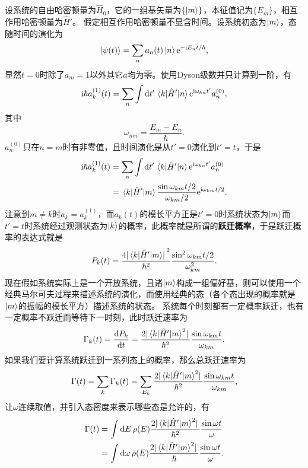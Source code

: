 \documentclass[UTF8, a4paper]{ctexart}
\newcommand*{\ii}{\mathrm{i}}
\newcommand*{\ee}{\mathrm{e}}
\begin{document}
设系统的自由哈密顿量为$\hat{H}_0$，它的一组基矢量为$\{\ket{m}\}$，本征值记为$\{E_m\}$，相互作用哈密顿量为$\hat{H}'$。
假定相互作用哈密顿量不显含时间。设系统初态为$\ket{m}$，态随时间的演化为
\[
    \ket{\psi(t)} = \sum_n a_n(t) \ket{n} \ee^{- \ii E_n t / \hbar},
\]
显然$t=0$时除了$a_m=1$以外其它$a$均为零。使用Dyson级数并只计算到一阶，有
\[
    \ii \hbar a^{(1)}_k(t) = \sum_n \int \dd{t'} \mel{k}{\hat{H}'}{n} \ee^{\ii \omega_{kn} t'} a_n^{(0)},
\]
其中
\[
    \omega_{mn} = \frac{E_m - E_n}{\hbar}.
\]
$a_n^{(0)}$只在$n=m$时有非零值，且时间演化是从$t'=0$演化到$t'=t$，于是
\[
    \begin{aligned}
        \ii \hbar a^{(1)}_k(t) &= \sum_n \int \dd{t'} \mel{k}{\hat{H}'}{n} \ee^{\ii \omega_{kn} t'} a_n^{(0)} \\
        &= \mel{k}{\hat{H}'}{m} \frac{\sin \omega_{km} t / 2}{\omega_{km} / 2} \ee^{\ii \omega_{km} t / 2}. 
    \end{aligned}
\]
注意到$m \neq k$时$a_k = a_k^{(1)}$，而$a_k(t)$的模长平方正是$t'=0$时系统状态为$\ket{m}$而$t'=t$时系统经过观测状态为$\ket{k}$的概率，此概率就是所谓的\textbf{跃迁概率}，于是跃迁概率的表达式就是
\begin{equation}
    P_k(t) = \frac{4 \abs*{\mel{k}{\hat{H}'}{m}}^2}{\hbar^2} \frac{\sin^2 \omega_{km} t / 2}{\omega_{km}^2}.
\end{equation}
现在假如系统实际上是一个开放系统，且诸$\ket{m}$构成一组偏好基，则可以使用一个经典马尔可夫过程来描述系统的演化，而使用经典的态（各个态出现的概率就是$\ket{m}$的振幅的模长平方）描述系统的状态。
系统每个时刻都有一定概率跃迁，也有一定概率不跃迁而等待下一时刻，此时跃迁速率为%
\begin{equation}
    \Gamma_k(t) = \dv{P_k}{t} = \frac{2 \abs*{\mel{k}{\hat{H}'}{m}^2}}{\hbar^2} \frac{\sin \omega_{km} t}{\omega_{km}}.
\end{equation}
如果我们要计算系统跃迁到一系列态上的概率，那么总跃迁速率为
\[
    \Gamma(t) = \sum_k \Gamma_k(t) = \sum_{E_k} \frac{2 \abs*{\mel{k}{\hat{H}'}{m}^2}}{\hbar^2} \frac{\sin \omega_{km} t}{\omega_{km}},
\]
让$\omega$连续取值，并引入态密度来表示哪些态是允许的，有
\begin{equation}
    \begin{aligned}
        \Gamma(t) &= \int \dd{E} \rho(E) \frac{2 \abs*{\mel{k}{\hat{H}'}{m}^2}}{\hbar^2} \frac{\sin \omega t}{\omega} \\
        &= \int \dd{\omega} \rho(E) \frac{2 \abs*{\mel{k}{\hat{H}'}{m}^2}}{\hbar} \frac{\sin \omega t}{\omega}.
    \end{aligned}
\end{equation}
\end{document}
